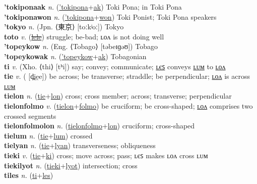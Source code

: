 \textbf{'tokiponaak} \textit{n.} (\hyperref['tokipona]{'tokipona}+\hyperref[ak]{ak})
Toki Pona; in Toki Pona \label{'tokiponaak} \\
\textbf{'tokiponawon} \textit{n.} (\hyperref['tokipona]{'tokipona}+\hyperref[won]{won})
Toki Ponist; Toki Pona speakers \label{'tokiponawon} \\
\textbf{'tokyo} \textit{n.} (Jpn. ⟨東京⟩ [toːkʲoː])
Tokyo \label{'tokyo} \\
\textbf{toto} \textit{v.} (\hyperref[lele]{\sout{lele}})
struggle; be-bad; ʟᴏᴧ is not doing well \label{toto} \\
\textbf{'topeykow} \textit{n.} (Eng. ⟨Tobago⟩ [təbeɪɡəʊ])
Tobago \label{'topeykow} \\
\textbf{'topeykowak} \textit{n.} (\hyperref['topeykow]{'topeykow}+\hyperref[ak]{ak})
Tobagonian \label{'topeykowak} \\
\textbf{ti} \textit{v.} (Xho. ⟨thi⟩ [tʰi])
say; convey; communicate; \hyperref[tiles]{ʟєꜱ} conveys \hyperref[tilum]{ʟᴜᴍ} to \hyperref[tilon]{ʟᴏᴧ} \label{ti} \\
\textbf{tie} \textit{v.} ( [d̪ie̯e])
be across; be transverse; straddle; be perpendicular; \hyperref[tielon]{ʟᴏᴧ} is across \hyperref[tielum]{ʟᴜᴍ} \label{tie} \\
\textbf{tielon} \textit{n.} (\hyperref[tie]{tie}+\hyperref[lon]{lon})
cross; cross member; across; transverse; perpendicular \label{tielon} \\
\textbf{tielonfolmo} \textit{v.} (\hyperref[tielon]{tielon}+\hyperref[folmo]{folmo})
be cruciform; be cross-shaped; \hyperref[tielonfolmolon]{ʟᴏᴧ} comprises two crossed segments \label{tielonfolmo} \\
\textbf{tielonfolmolon} \textit{n.} (\hyperref[tielonfolmo]{tielonfolmo}+\hyperref[lon]{lon})
cruciform; cross-shaped \label{tielonfolmolon} \\
\textbf{tielum} \textit{n.} (\hyperref[tie]{tie}+\hyperref[lum]{lum})
crossed \label{tielum} \\
\textbf{tielyan} \textit{n.} (\hyperref[tie]{tie}+\hyperref[lyan]{lyan})
transverseness; obliqueness \label{tielyan} \\
\textbf{tieki} \textit{v.} (\hyperref[tie]{tie}+\hyperref[ki]{ki})
cross; move across; pass; ʟєꜱ makes ʟᴏᴧ cross ʟᴜᴍ \label{tieki} \\
\textbf{tiekilyot} \textit{n.} (\hyperref[tieki]{tieki}+\hyperref[lyot]{lyot})
intersection; cross \label{tiekilyot} \\
\textbf{tiles} \textit{n.} (\hyperref[ti]{ti}+\hyperref[les]{les})
